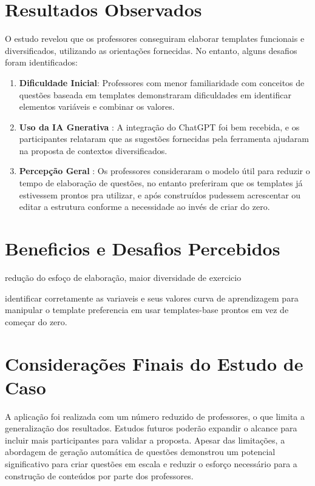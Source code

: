 \begin{enumerate}
    
\end{enumerate}






\section{Resultados Observados}

O estudo revelou que os professores conseguiram elaborar templates funcionais e diversificados, utilizando as orientações fornecidas. No entanto, alguns desafios foram identificados:

\begin{enumerate}
    \item \textbf{Dificuldade Inicial}: Professores com menor familiaridade com conceitos de questões baseada em templates demonstraram dificuldades em identificar elementos variáveis e combinar os valores.
    \item \textbf{Uso da IA Gnerativa} : A integração do ChatGPT foi bem recebida, e os participantes relataram que as sugestões fornecidas pela ferramenta ajudaram na proposta de contextos diversificados.
    \item \textbf{Percepção Geral} : Os professores consideraram o modelo útil para reduzir o tempo de elaboração de questões, no entanto preferiram que os templates já estivessem prontos pra utilizar, e após construídos pudessem acrescentar ou editar a estrutura conforme a necessidade ao invés de criar do zero.
\end{enumerate}


\section{Beneficios e Desafios Percebidos}

redução do esfoço de elaboração, maior diversidade de exercicio

identificar corretamente as variaveis e seus valores
curva de aprendizagem para manipular o template
preferencia em usar templates-base prontos em vez de começar do zero.

\section{Considerações Finais do Estudo de Caso}
A aplicação foi realizada com um número reduzido de professores, o que limita a generalização dos resultados. Estudos futuros poderão expandir o alcance para incluir mais participantes para validar a proposta. Apesar das limitações, a abordagem de geração automática de questões demonstrou um potencial significativo para criar questões em escala e reduzir o esforço necessário para a construção de conteúdos por parte dos professores.


